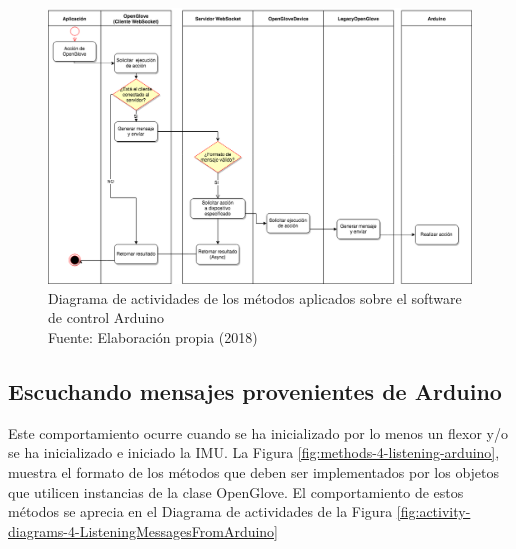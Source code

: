 \begin{figure}[H]
  \begin{center} 
   	\includegraphics[width=1.0\textwidth]{images/chapter04/ActivityDiagrams-OpenGloveActions-3.png} 
   \captionsetup{justification=centering}
    \caption[Diagrama de actividades de los métodos aplicados sobre el software de control Arduino]{Diagrama de actividades de los métodos aplicados sobre el software de control Arduino\\Fuente: Elaboración propia (2018)}
    \label{fig:activity-diagrams-3-openglove-arduino}
  \end{center}
\end{figure}


\subsection{Escuchando mensajes provenientes de Arduino}
\label{subsection:reading-openglove-arduino}
Este comportamiento ocurre cuando se ha inicializado por lo menos un flexor y/o se ha inicializado e iniciado la IMU. La Figura \ref{fig:methods-4-listening-arduino}, muestra el formato de los métodos que deben ser implementados por los objetos que utilicen instancias de la clase OpenGlove. El comportamiento de estos métodos se aprecia en el Diagrama de actividades de la Figura \ref{fig:activity-diagrams-4-ListeningMessagesFromArduino}

